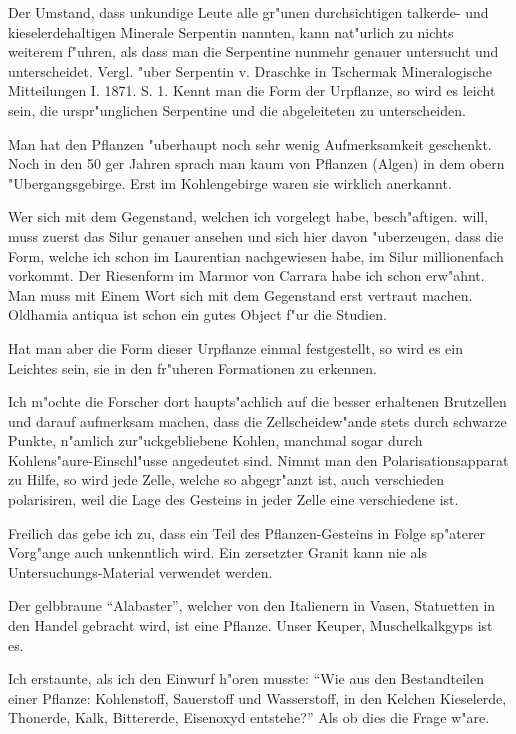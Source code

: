 \documentclass[a4paper, 11pt, oneside, german]{article}
\begin{document}
Der Umstand, dass unkundige Leute alle gr"unen durchsichtigen talkerde- und kieselerdehaltigen Minerale Serpentin nannten, kann nat"urlich zu nichts weiterem f"uhren, als dass man die Serpentine nunmehr genauer untersucht und unterscheidet. Vergl. "uber Serpentin v. Draschke in Tschermak Mineralogische Mitteilungen I. 1871. S. 1. Kennt man die Form der Urpflanze, so wird es leicht sein, die urspr"unglichen Serpentine und die abgeleiteten zu unterscheiden.

Man hat den Pflanzen "uberhaupt noch sehr wenig Aufmerksamkeit geschenkt. Noch in den 50 ger Jahren sprach man kaum von Pflanzen (Algen) in dem obern "Ubergangsgebirge. Erst im Kohlengebirge waren sie wirklich anerkannt.

Wer sich mit dem Gegenstand, welchen ich vorgelegt habe, besch"aftigen. will, muss zuerst das Silur genauer ansehen und sich hier davon "uberzeugen, dass die Form, welche ich schon im Laurentian nachgewiesen habe, im Silur millionenfach vorkommt. Der Riesenform im Marmor von Carrara habe ich schon erw"ahnt. Man muss mit Einem Wort sich mit dem Gegenstand erst vertraut machen. Oldhamia antiqua ist schon ein gutes Object f"ur die Studien.

Hat man aber die Form dieser Urpflanze einmal festgestellt, so wird es ein Leichtes sein, sie in den fr"uheren Formationen zu erkennen.

Ich m"ochte die Forscher dort haupts"achlich auf die besser erhaltenen Brutzellen und darauf aufmerksam machen, dass die Zellscheidew"ande stets durch schwarze Punkte, n"amlich zur"uckgebliebene Kohlen, manchmal sogar durch Kohlens"aure-Einschl"usse angedeutet sind. Nimmt man den Polarisationsapparat zu Hilfe, so wird jede Zelle, welche so abgegr"anzt ist, auch verschieden polarisiren, weil die Lage des Gesteins in jeder Zelle eine verschiedene ist.

Freilich das gebe ich zu, dass ein Teil des Pflanzen-Gesteins in Folge sp"aterer Vorg"ange auch unkenntlich wird. Ein zersetzter Granit kann nie als Untersuchungs-Material verwendet werden.

Der gelbbraune "`Alabaster"', welcher von den Italienern in Vasen, Statuetten in den Handel gebracht wird, ist eine Pflanze. Unser Keuper, Muschelkalkgyps ist es.

Ich erstaunte, als ich den Einwurf h"oren musste: "`Wie aus den Bestandteilen einer Pflanze: Kohlenstoff, Sauerstoff und Wasserstoff, in den Kelchen Kieselerde, Thonerde, Kalk, Bittererde, Eisenoxyd entstehe?"' Als ob dies die Frage w"are.
\end{document}
